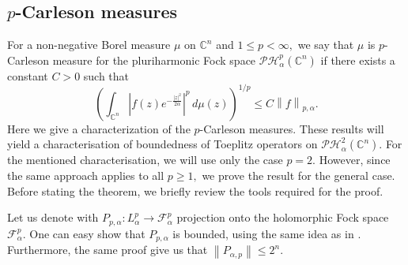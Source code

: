 \documentclass[10pt,leqno]{amsart}
\theoremstyle{remark}
\numberwithin{equation}{section}
\newcommand{\hph}{\mathcal{PH}_\alpha^2(\mathbb{C}^n)}%
\begin{document}
\subsection{\texorpdfstring{$p$}{p}-Carleson measures}
For a non-negative Borel measure $\mu$ on $\mathbb{C}^{n}$  and $1\leq p<\infty,$ we say that $\mu$  is $p$-Carleson measure for the pluriharmonic Fock space $\mathcal{PH}_\alpha^{p}(\mathbb{C}^{n})$ if there exists a constant $C>0$  such that
\[
	\left( \int_{\mathbb{C}^{n}}^{}\left| f(z) e^{-\frac{|z|^2}{2\alpha}} \right| ^{p}\, d\mu(z)  \right) ^{1/p}\leq C \left\lVert f \right\rVert _{p,\alpha}.
\]
Here we give a characterization of the $p$-Carleson measures. These results will yield a characterisation of boundedness of Toeplitz operators on $\hph.$ For the mentioned characterisation, we will use only the case $p=2.$ However, since the same approach applies to all $p\geq 1,$ we prove the result for the general case.  Before stating the theorem, we briefly review the tools required for the proof.

Let us denote with $P_{p,\alpha} :  L_\alpha^p \to \mathcal{F}^{p}_\alpha$ projection onto the holomorphic Fock space $\mathcal{F}^p_\alpha.$ One can easy show that $P_{p,\alpha}$ is bounded, using the same idea as in  \cite[Thm 2.20]{KeheZhuAnalysisOnFockSpaces}. Furthermore, the same proof give us that $\left\lVert P_{\alpha,p}\right\rVert \leq 2^n.$
\end{document}
